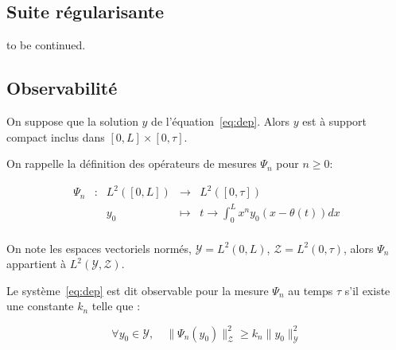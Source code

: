 \documentclass[a4paper]{article}
\begin{document}
\subsection{Suite régularisante}


to be continued.


\subsection{Observabilité}


On suppose que la solution $y$ de l'équation~\eqref{eq:dep}.
Alors $y$ est à support compact inclus dans $[0,L] \times [0,\tau]$. 

On rappelle la définition des opérateurs de mesures $\Psi_n$ pour $n \geq 0$:

 \begin{equation}
	\begin{array}{ccccc}
	\Psi_n & : & L^2([0,L]) & \to & L^2([0,\tau]) \\
	 & & y_0 & \mapsto & t \to \int_0^L x^n y_0(x-\theta(t)) dx\\
	\end{array}
\end{equation}

On note les espaces vectoriels normés,
 $\mathscr{Y} = L^2 (0,L)$,
 $\mathscr{Z} = L^2 (0,\tau)$,
alors $\Psi_n$ appartient à $L^2(\mathscr{Y},\mathscr{Z})$. 

\begin{definition}
Le système~\eqref{eq:dep} est dit observable pour la mesure $\Psi_n$ 
au temps $\tau$ s'il existe une constante $k_n$ telle que :

\begin{equation}
	\label{obs}
	\forall y_0 \in \mathscr{Y}, \quad \| \Psi_n(y_0)\|_{\mathscr{Z}}^2 \geq k_n \|y_0\|^2_{\mathscr{Y}}
\end{equation}

\end{definition}
\end{document}
